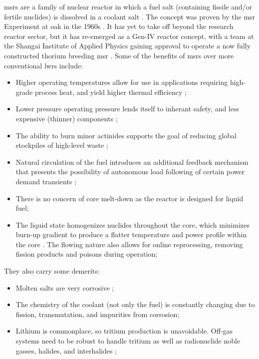 \acfp{msr} are a family of nuclear reactor in which a fuel salt (containing fissile and/or fertile nuclides) is dissolved in a coolant salt \cite{RoperOverview}. The concept was proven by the \acl{msr} Experiment at \acf{oak} in the 1960s \cite{MSRE}. It has yet to take off beyond the research reactor sector, but it has re-emerged as a Gen-IV reactor concept, with a team at the Shangai Institute of Applied Physics gaining approval to operate a now fully constructed thorium breeding \acs{msr} \cite{china}. Some of the benefits of \acsp{msr} over more conventional \acsp{lwr} include:
\begin{itemize}
    \item Higher operating temperatures allow for use in applications requiring high-grade process heat, and yield higher thermal efficiency \cite{RoperOverview};
    \item Lower pressure operating pressure lends itself to inherant safety, and less expensive (thinner) components \cite{RoperReview};
    \item The ability to burn minor actinides supports the goal of reducing global stockpiles of high-level waste \cite{RoperReview};
    \item Natural circulation of the fuel introduces an additional feedback mechanism that presents the possibility of autonomous load following of certain power demand transients \cite{CarterNumerical};
    \item There is no concern of core melt-down as the reactor is designed for liquid fuel;
    \item The liquid state homogenizes nuclides throughout the core, which minimizes burn-up gradient to produce a flatter temperature and power profile within the core \cite{Lamarsh,TodreasKazimi1}. The flowing nature also allows for online reprocessing, removing fission products and poisons during operation;
\end{itemize}

They also carry some demerits:
\begin{itemize}
    \item Molten salts are very corrosive \cite{RoperRedox};
    \item The chemistry of the coolant (not only the fuel) is constantly changing due to fission, transmutation, and impurities from corrosion;
    \item Lithium is commonplace, so tritium production is unavoidable. Off-gas systems need to be robust to handle tritium as well as radionuclide noble gasses, halides, and interhalides \cite{HolcombOffgas};
\end{itemize}

